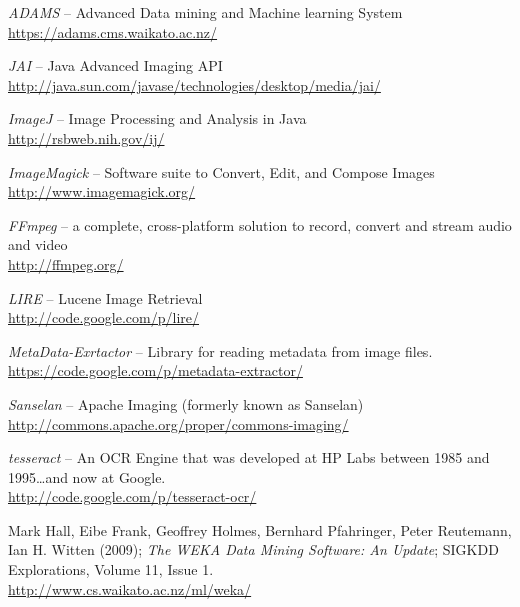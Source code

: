 %

\begin{thebibliography}{999}

		\textit{ADAMS} -- Advanced Data mining and Machine learning System \\
		\url{https://adams.cms.waikato.ac.nz/}{}

	 	\textit{JAI} -- Java Advanced Imaging API \\
		\url{http://java.sun.com/javase/technologies/desktop/media/jai/}{}

		\textit{ImageJ} -- Image Processing and Analysis in Java \\
		\url{http://rsbweb.nih.gov/ij/}{}

		\textit{ImageMagick} -- Software suite to Convert, Edit, and Compose Images \\
		\url{http://www.imagemagick.org/}{}

		\textit{FFmpeg} -- a complete, cross-platform solution to record, convert and stream audio and video \\
		\url{http://ffmpeg.org/}{}

		\textit{LIRE} -- Lucene Image Retrieval \\
		\url{http://code.google.com/p/lire/}{}

		\textit{MetaData-Exrtactor} -- Library for reading metadata from image files.  \\
		\url{https://code.google.com/p/metadata-extractor/}{}

		\textit{Sanselan} -- Apache Imaging (formerly known as Sanselan) \\
		\url{http://commons.apache.org/proper/commons-imaging/}{}

		\textit{tesseract} -- An OCR Engine that was developed at HP Labs between 1985 and 1995\ldots and now at Google. \\
		\url{http://code.google.com/p/tesseract-ocr/}{}

	 	Mark Hall, Eibe Frank, Geoffrey Holmes, Bernhard Pfahringer, Peter
	 	Reutemann, Ian H. Witten (2009); \textit{The WEKA Data Mining Software: An
	 	Update}; SIGKDD Explorations, Volume 11, Issue 1. \\
		\url{http://www.cs.waikato.ac.nz/ml/weka/}{}

\end{thebibliography}
